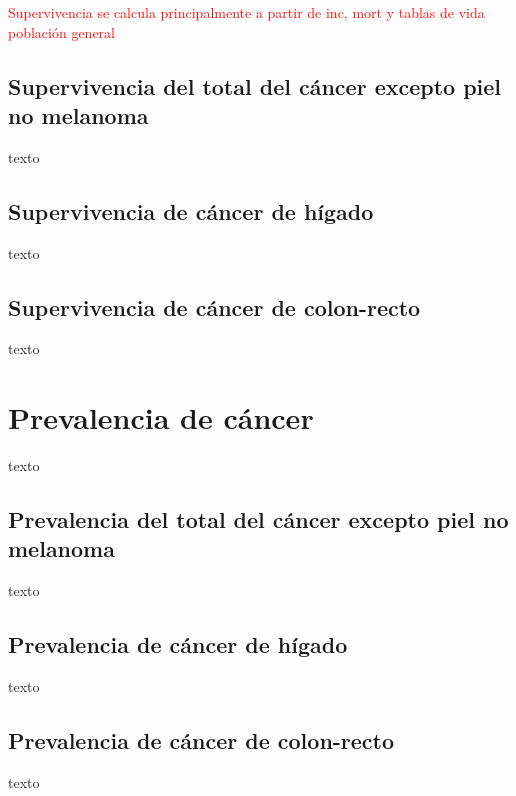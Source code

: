 \textcolor{red}{Supervivencia se calcula principalmente a partir de inc, mort y tablas de vida población general}

\subsection{Supervivencia del total del cáncer excepto piel no melanoma}

texto

\subsection{Supervivencia de cáncer de hígado}

texto

\subsection{Supervivencia de cáncer de colon-recto}

texto


\section{Prevalencia de cáncer}

texto

\subsection{Prevalencia del total del cáncer excepto piel no melanoma}

texto

\subsection{Prevalencia de cáncer de hígado}

texto

\subsection{Prevalencia de cáncer de colon-recto}

texto






